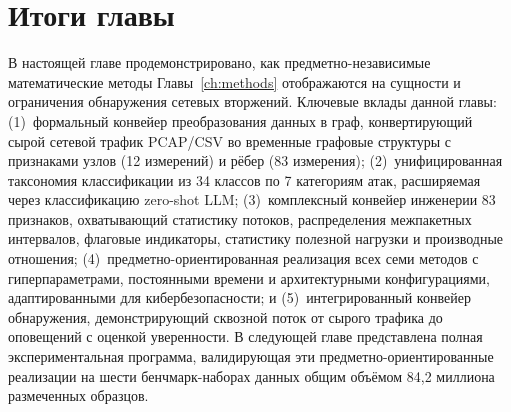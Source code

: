 \section{Итоги главы}
\label{sec:ch3_summary}

В настоящей главе продемонстрировано, как предметно-независимые математические методы Главы~\ref{ch:methods} отображаются на сущности и ограничения обнаружения сетевых вторжений. Ключевые вклады данной главы: (1)~формальный конвейер преобразования данных в граф, конвертирующий сырой сетевой трафик PCAP/CSV во временные графовые структуры с признаками узлов (12 измерений) и рёбер (83 измерения); (2)~унифицированная таксономия классификации из 34 классов по 7 категориям атак, расширяемая через классификацию zero-shot LLM; (3)~комплексный конвейер инженерии 83 признаков, охватывающий статистику потоков, распределения межпакетных интервалов, флаговые индикаторы, статистику полезной нагрузки и производные отношения; (4)~предметно-ориентированная реализация всех семи методов с гиперпараметрами, постоянными времени и архитектурными конфигурациями, адаптированными для кибербезопасности; и (5)~интегрированный конвейер обнаружения, демонстрирующий сквозной поток от сырого трафика до оповещений с оценкой уверенности. В следующей главе представлена полная экспериментальная программа, валидирующая эти предметно-ориентированные реализации на шести бенчмарк-наборах данных общим объёмом 84,2 миллиона размеченных образцов.


